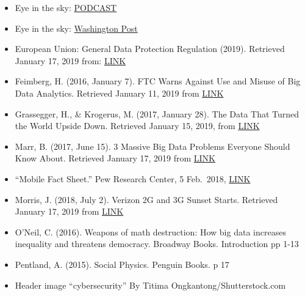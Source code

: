 \documentclass[]{book}
\theoremstyle{definition}
\theoremstyle{definition}
\theoremstyle{definition}
\theoremstyle{remark}
\begin{document}
\begin{itemize}
\item
  Eye in the sky:
  \href{https://www.wnycstudios.org/story/eye-sky}{PODCAST}
\item
  Eye in the sky:
  \href{https://www.washingtonpost.com/business/technology/new-surveillance-technology-can-track-everyone-in-an-area-for-several-hours-at-a-time/2014/02/05/82f1556e-876f-11e3-a5bd-844629433ba3_story.html?utm_term=.3be05b5b0d1d}{Washington
  Post}
\item
  European Union: General Data Protection Regulation (2019). Retrieved
  January 17, 2019 from: \href{https://eugdpr.org/the-regulation/}{LINK}
\item
  Feimberg, H. (2016, January 7). FTC Warns Against Use and Misuse of
  Big Data Analytics. Retrieved January 11, 2019 from
  \href{https://www.insightsassociation.org/article/ftc-warns-against-use-and-misuse-big-data-analytics}{LINK}
\item
  Grassegger, H., \& Krogerus, M. (2017, January 28). The Data That
  Turned the World Upside Down. Retrieved January 15, 2019, from
  \href{https://publicpolicy.stanford.edu/news/data-turned-world-upside-down}{LINK}
\item
  Marr, B. (2017, June 15). 3 Massive Big Data Problems Everyone Should
  Know About. Retrieved January 17, 2019 from
  \href{https://www.forbes.com/sites/bernardmarr/2017/06/15/3-massive-big-data-problems-everyone-should-know-about/\#4eeeb8a96186}{LINK}
\item
  ``Mobile Fact Sheet.'' Pew Research Center, 5 Feb.~2018,
  \href{www.pewinternet.org/fact-sheet/mobile/}{LINK}
\item
  Morris, J. (2018, July 2). Verizon 2G and 3G Sunset Starts. Retrieved
  January 17, 2019 from
  \href{https://www.digi.com/blog/verizon-2g-and-3g-sunset-starts/}{LINK}
\item
  O'Neil, C. (2016). Weapons of math destruction: How big data increases
  inequality and threatens democracy. Broadway Books. Introduction pp
  1-13
\item
  Pentland, A. (2015). Social Physics. Penguin Books. p 17
\item
  Header image ``cybersecurity'' By Titima Ongkantong/Shutterstock.com
\end{itemize}


\end{document}

